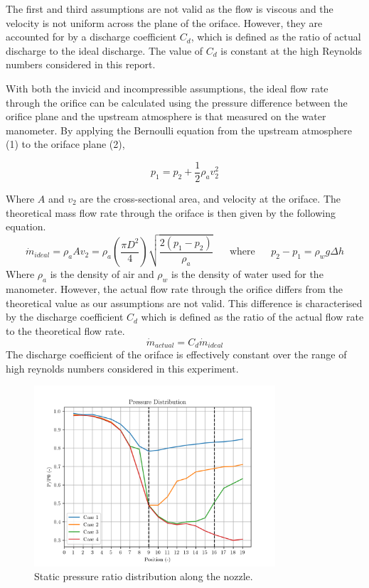 \documentclass[8pt]{article}
\begin{document}
The first and third assumptions are not valid as the flow is viscous and the velocity is not uniform across the plane of the oriface. However, they are accounted for by a discharge coefficient $C_d$, which is defined as the ratio of actual discharge to the ideal discharge.
The value of $C_d$ is constant at the high Reynolds numbers considered in this report.

With both the invicid and incompressible assumptions, the ideal flow rate through the orifice can be calculated using the pressure difference between the orifice plane and the upstream atmosphere is that measured on the
water manometer. By applying the Bernoulli equation from the upstream atmosphere (1) to the oriface plane (2),

\begin{equation}
    p_1 = p_2 + \frac{1}{2} \rho_a v_2^2
\end{equation}

Where $A$ and $v_2$ are the cross-sectional area, and velocity at the oriface. The theoretical mass flow rate through the oriface is then given by the following equation.
\begin{equation}
    \dot{m}_{ideal} = \rho_a A v_2 = \rho_a \left( \frac{\pi D^2}{4}\right) \sqrt{\frac{2(p_1-p_2)}{\rho_a}} \;\;\;\;\;\; \text{where} \;\;\;\;\;\ p_2 - p_1 = \rho_w g \Delta h
\end{equation}
Where $\rho_a$ is the density of air and $\rho_w$ is the density of water used for the manometer.
However, the actual flow rate through the orifice differs from the theoretical value as our assumptions are not valid.
This difference is characterised by the discharge coefficient $C_d$ which is defined as the ratio of the actual flow rate to the theoretical flow rate.
\begin{equation}
    \dot{m}_{actual} = C_d \dot{m}_{ideal}
\end{equation}
The discharge coefficient of the oriface is effectively constant over the range of high reynolds numbers considered in this experiment. 

\begin{figure}[H]
    \centering
    \includegraphics[width=0.8\textwidth]{pressure_ratio_distribution_corrected.png}
    \caption{Static pressure ratio distribution along the nozzle.}
    \label{fig:figure4}
\end{figure}
\end{document}
